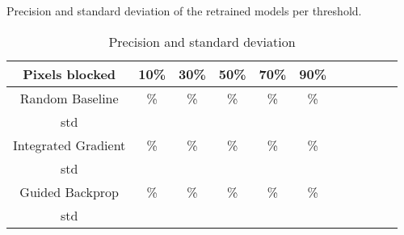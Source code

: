 \documentclass[
		a4paper,
		oneside,
		onecolumn,
		openany,
		parskip=half*,
		table,
		11pt,
		fleqn,
	]{scrbook}
\begin{document}
Precision and standard deviation of the retrained models per threshold.

\begin{table}[h]
	\centering
	\begin{tabular}{|c|c|c|c|c|c|c|c|c|c|c|}
		\hline
		
		Pixels blocked & 10\% & 30\% & 50\% & 70\% & 90\% \\
		\hline
		Random Baseline & \% & \% & \% & \% & \% \\
		std & & & & &  \\
		\hline
		Integrated Gradient& \% & \% & \% & \% & \%  \\
		std & & & & &  \\
		\hline
		Guided Backprop & \% & \% & \% & \% & \%  \\
		std & & & & &  \\
		\hline
	\end{tabular} \newline
	
	\caption{Precision and standard deviation}
	\label{tab:sclass_precision_ig}
\end{table}
\end{document}
